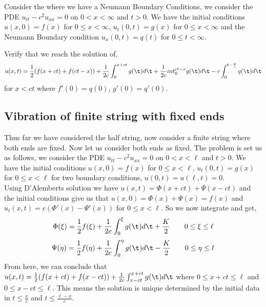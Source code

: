 \noindent
Consider the where we have a Neumann Boundary Conditions, we consider the PDE $u_{tt} -c^2u_{xx} = 0$ on $0 < x < \infty$ and $t > 0$. We have the initial conditions $u(x, 0) = f(x)$ for $0 \le x < \infty$, $u_t(0, t) = g(x)$ for $0 \le x < \infty$ and the Neumann Boundary condition $u_x(0, t) = q(t)$ for $0 \le t < \infty$.\\

\begin{exercise}
  Verify that we reach the solution of,
  $$ u(x, t) = \frac{1}{2}(f(x + ct) + f(ct - x)) + \frac{1}{2c}\int_{0}^{x+ct}g(\t)d\t + \frac{1}{2c}int_0^{ct - x} g(\t)d\t - c\int_0^{t - \frac{x}{c}} q(\t)d\t $$
  for $x < ct$ where $f'(0) = q(0)$, $g'(0) = q'(0)$.
\end{exercise}

\subsection{Vibration of finite string with fixed ends}

Thus far we have considered the half string, now consider a finite string where both ends are fixed. Now let us consider both ends as fixed. The problem is set us as follows, we consider the PDE $u_{tt} -c^2u_{xx} = 0$ on $0 < x < \ell$ and $t > 0$. We have the initial conditions $u(x, 0) = f(x)$ for $0 \le x < \ell$, $u_t(0, t) = g(x)$ for $0 \le x < \ell$ for two boundary conditions, $u(0, t) = u(\ell, t) = 0$. \\

\noindent
Using D'Alemberts solution we have $u(x, t) = \Phi(x + ct) + \Psi(x - ct)$ and the initial conditions give us that $u(x, 0) = \Phi(x) + \Psi(x) = f(x)$ and $u_t(x, t) = c(\Phi'(x) - \Psi'(x))$ for $0 \le x < \ell$. So we now integrate and get,
$$ \Phi(\xi) = \frac{1}{2}f(\xi) + \frac{1}{2c}\int_0^\xi g(\t)d\t + \frac{K}{2} \qquad 0 \le \xi \le \ell $$
$$ \Psi(\eta) = \frac{1}{2}f(\eta) + \frac{1}{2c}\int_0^\eta g(\t)d\t - \frac{K}{2} \qquad 0 \le \eta \le \ell $$
From here, we can conclude that $u(x, t) = \frac{1}{2}(f(x + ct) + f(x - ct)) + \frac{1}{2c}\int_{x - ct}^{x + ct} g(\t)d\t$ where $0 \le x + ct \le \ell$ and $0 \le x - ct \le \ell$. This means the solution is unique determined by the initial data in $t \le \frac{x}{c}$ and $t \le \frac{\ell - x}{c}$.

